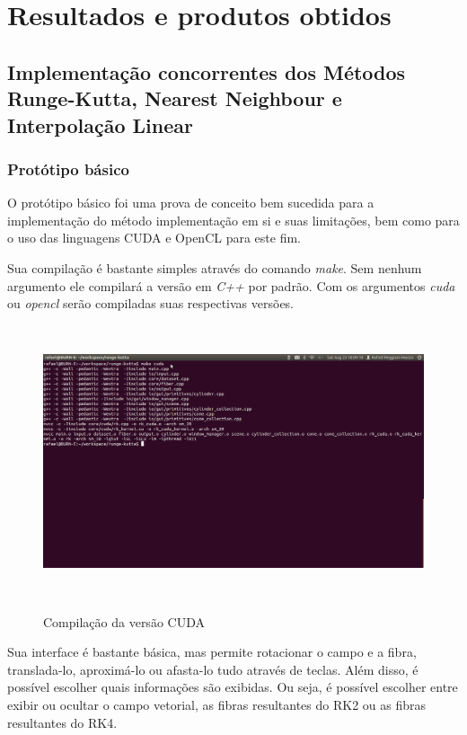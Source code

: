 \chapter{Resultados e produtos obtidos}

\section{Implementação concorrentes dos Métodos Runge-Kutta, Nearest Neighbour e Interpolação Linear}
  \subsection{Protótipo básico}
  O protótipo básico foi uma prova de conceito bem sucedida para a implementação do método implementação em si e suas limitações, bem como para o uso das linguagens CUDA e OpenCL para este fim.
  
  Sua compilação é bastante simples através do comando \textit{make}. Sem nenhum argumento ele compilará a versão em \textit{C++} por padrão. Com os argumentos \textit{cuda} ou \textit{opencl} serão compiladas suas respectivas versões.
  
  \begin{figure}[!h]
    \begin{center}
      \includegraphics[width=140mm, height=80mm]{images/compilacao.png}
      \label{fig:}
      \caption{Compilação da versão CUDA}
    \end{center}
  \end{figure}
  
  \newpage  
  Sua interface é bastante básica, mas permite rotacionar o campo e a fibra, translada-lo, aproximá-lo ou afasta-lo tudo através de teclas. Além disso, é possível escolher quais informações são exibidas. Ou seja, é possível escolher entre exibir ou ocultar o campo vetorial, as fibras resultantes do RK2 ou as fibras resultantes do RK4.
  
